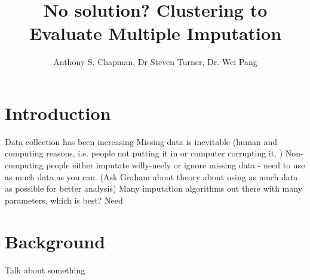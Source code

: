 \documentclass{IEEEconf}
\title{No solution? Clustering to Evaluate Multiple Imputation }
\author{Anthony S. Chapman, Dr Steven Turner, Dr. Wei Pang}
\begin{document}
 
	\maketitle{} 





	\section{Introduction} %
	\label{sec:introduction}
		Data collection has been increasing 
		Missing data is inevitable (human and computing reasons, i.e. people not putting it in or computer corrupting it, )
		Non-computing people either imputate willy-neely or ignore missing data - need to use as much data as you can. (Ask Graham about theory about using as much data as possible for better analysis)
		Many imputation algorithms out there with many parameters, which is best? 
		Need 

	\section{Background} %
	\label{sec:background}
		Talk about something \cite{epi1}
		\cite{bigData}
\end{document}
